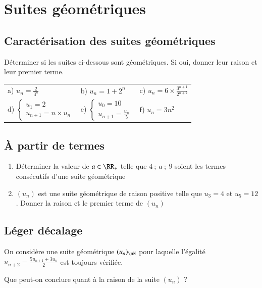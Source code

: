 \documentclass[oneside,12pt]{article}          %
\begin{document}
\section{Suites géométriques}

\subsection{Caractérisation des suites géométriques}
Déterminer si les suites ci-dessous sont géométriques. Si oui, donner leur raison et leur premier terme.\\
\begin{tabular}{p{} p{} p{}}
	a) $u_n=\frac{2}{3^{n}}$ & b) $u_n=1+2^{n}$ & c) $u_n=6\times\frac{3^{n+1}}{2^{n+2}}$ \\
	d) $ \begin{cases}u_{1}=2\\u_{n+1}=n\times u_n\end{cases}$ & e) $\begin{cases}u_{0}=10\\u_{n+1}=\frac{u_n}{5}\end{cases}$ & f) $u_n=3n^{2}$
\end{tabular}



\subsection{À partir de termes}

\begin{enumerate}
    \item Déterminer la valeur de $a\in\RR_{+}$ telle que $4~;~a~;~9$ soient les termes consécutifs d'une suite géométrique
    \item  $(u_n)$ est une suite géométrique de raison positive telle que $u_{3}=4$ et $u_{5}=12$. Donner la raison et le premier terme de $(u_n)$
\end{enumerate}



\subsection{Léger décalage}

On considère une suite géométrique $(u_n)_{\nN}$ pour laquelle l'égalité $u_{n+2}=\frac{5u_{n+1}+3u_n}{2}$ est toujours vérifiée.

Que peut-on conclure quant à la raison de la suite $(u_n)$ ?
\end{document}
